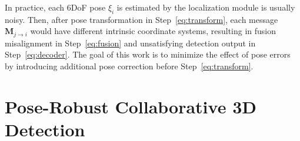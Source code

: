\documentclass[letterpaper, 10 pt, conference]{ieeeconf}  %
\begin{document}
In practice, each 6DoF pose $\xi_i$ is estimated by the localization module is usually noisy. Then, after pose transformation in Step~\eqref{eq:transform}, each message $\mathbf{M}_{j \rightarrow i}$ would have different intrinsic coordinate systems, resulting in fusion misalignment in Step~\eqref{eq:fusion} and unsatisfying detection output in Step~\eqref{eq:decoder}. The goal of this work is to minimize the effect of pose errors by introducing additional pose correction before Step~\eqref{eq:transform}.











\section{Pose-Robust Collaborative 3D Detection}
\end{document}
